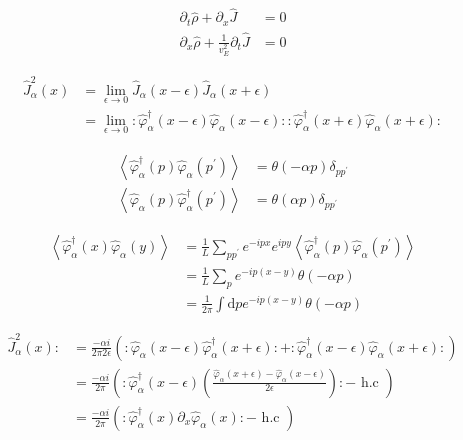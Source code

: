 \begin{align*}
\partial_{t} \hat{\rho}+\partial_{x} \hat{J} & =0  \tag{2.16}\\
\partial_{x} \hat{\rho}+\frac{1}{v_{E}^{2}} \partial_{t} \hat{J} & =0
\end{align*}





\begin{align*}
\hat{J}_{\alpha}^{2}(x) & =\lim _{\epsilon \rightarrow 0} \hat{J}_{\alpha}(x-\epsilon) \hat{J}_{\alpha}(x+\epsilon)  \tag{2.17}\\
& =\lim _{\epsilon \rightarrow 0}: \hat{\varphi}_{\alpha}^{\dagger}(x-\epsilon) \hat{\varphi}_{\alpha}(x-\epsilon):: \hat{\varphi}_{\alpha}^{\dagger}(x+\epsilon) \hat{\varphi}_{\alpha}(x+\epsilon):
\end{align*}




\begin{align*}
\left\langle\hat{\varphi}_{\alpha}^{\dagger}(p) \hat{\varphi}_{\alpha}\left(p^{\prime}\right)\right\rangle & =\theta(-\alpha p) \delta_{p p^{\prime}}  \tag{2.19}\\
\left\langle\hat{\varphi}_{\alpha}(p) \hat{\varphi}_{\alpha}^{\dagger}\left(p^{\prime}\right)\right\rangle & =\theta(\alpha p) \delta_{p p^{\prime}}
\end{align*}



\begin{align*}
\left\langle\hat{\varphi}_{\alpha}^{\dagger}(x) \hat{\varphi}_{\alpha}(y)\right\rangle & =\frac{1}{L} \sum_{p p^{\prime}} e^{-i p x} e^{i p y}\left\langle\hat{\varphi}_{\alpha}^{\dagger}(p) \hat{\varphi}_{\alpha}\left(p^{\prime}\right)\right\rangle \\
& =\frac{1}{L} \sum_{p} e^{-i p(x-y)} \theta(-\alpha p)  \tag{2.20}\\
& =\frac{1}{2 \pi} \int \mathrm{d} p e^{-i p(x-y)} \theta(-\alpha p)
\end{align*}



\begin{align*}
\hat{J}_{\alpha}^{2}(x): & =\frac{-\alpha i}{2 \pi 2 \epsilon}\left(: \hat{\varphi}_{\alpha}(x-\epsilon) \hat{\varphi}_{\alpha}^{\dagger}(x+\epsilon):+: \hat{\varphi}_{\alpha}^{\dagger}(x-\epsilon) \hat{\varphi}_{\alpha}(x+\epsilon):\right) \\
& =\frac{-\alpha i}{2 \pi}\left(: \hat{\varphi}_{\alpha}^{\dagger}(x-\epsilon)\left(\frac{\hat{\varphi}_{\alpha}(x+\epsilon)-\hat{\varphi}_{\alpha}(x-\epsilon)}{2 \epsilon}\right):- \text { h.c }\right)  \tag{2.23}\\
& =\frac{-\alpha i}{2 \pi}\left(: \hat{\varphi}_{\alpha}^{\dagger}(x) \partial_{x} \hat{\varphi}_{\alpha}(x):- \text { h.c }\right)
\end{align*}

